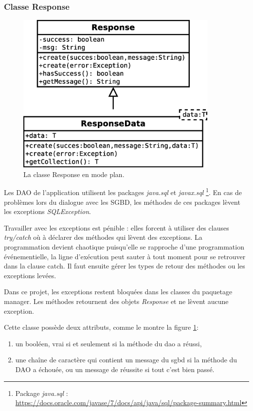 \subsubsection{Classe Response}
\begin{figure}[!h]
  \centering
  \includegraphics[width=10cm]{images/response.eps}
  \caption{La classe Response en mode plan.}
  \label{uml_classe_response}
\end{figure}

Les DAO de l'application utilisent les packages \textit{java.sql} et \textit{javax.sql}
\footnote{\label{paquetages_sql}Package \textit{java.sql} : \url{https://docs.oracle.com/javase/7/docs/api/java/sql/package-summary.html}}.
En cas de problèmes lors du dialogue avec les SGBD, les méthodes de ces packages lèvent les exceptions \textit{SQLException}.

Travailler avec les exceptions est pénible : elles forcent à utiliser des clauses \textit{try/catch} où à déclarer des méthodes qui lèvent des exceptions.
La programmation devient chaotique puisqu'elle se rapproche d'une programmation événementielle, la ligne d'exécution peut sauter à tout moment pour se retrouver dans la clause catch.
Il faut ensuite gérer les types de retour des méthodes ou les exceptions levées.

Dans ce projet, les exceptions restent bloquées dans les classes du paquetage manager.
Les méthodes retournent des objets \textit{Response} et ne lèvent aucune exception.

Cette classe possède deux attributs, comme le montre la figure \ref{uml_classe_response}:
\begin{enumerate}
\item un booléen, vrai si et seulement si la méthode du \gls{dao} a réussi,
\item une chaîne de caractère qui contient un message du \gls{sgbd} si la méthode du DAO a échouée, ou un message de réussite si tout c'est bien passé.
\end{enumerate}


